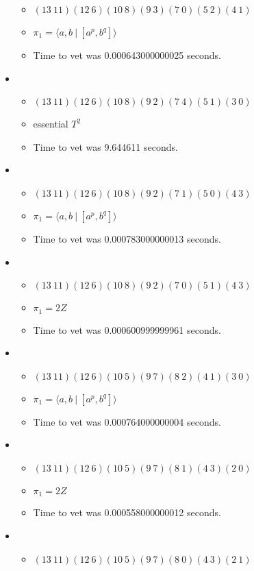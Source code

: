 \documentclass{article}
\begin{document}
\begin{itemize}
\begin{itemize}
      \item $(13\ 11)(12\ 6)(10\ 8)(9\ 3)(7\ 0)(5\ 2)(4\ 1)$
      \item $\pi_1 = \langle a,b\ |\ [a^p,b^q]\rangle$
      \item Time to vet was 0.000643000000025 seconds.
\end{itemize}
\item \begin{itemize}
      \item $(13\ 11)(12\ 6)(10\ 8)(9\ 2)(7\ 4)(5\ 1)(3\ 0)$
      \item essential $T^2$
      \item Time to vet was 9.644611 seconds.
\end{itemize}
\item \begin{itemize}
      \item $(13\ 11)(12\ 6)(10\ 8)(9\ 2)(7\ 1)(5\ 0)(4\ 3)$
      \item $\pi_1 = \langle a,b\ |\ [a^p,b^q]\rangle$
      \item Time to vet was 0.000783000000013 seconds.
\end{itemize}
\item \begin{itemize}
      \item $(13\ 11)(12\ 6)(10\ 8)(9\ 2)(7\ 0)(5\ 1)(4\ 3)$
      \item $\pi_1 =2 Z$
      \item Time to vet was 0.000600999999961 seconds.
\end{itemize}
\item \begin{itemize}
      \item $(13\ 11)(12\ 6)(10\ 5)(9\ 7)(8\ 2)(4\ 1)(3\ 0)$
      \item $\pi_1 = \langle a,b\ |\ [a^p,b^q]\rangle$
      \item Time to vet was 0.000764000000004 seconds.
\end{itemize}
\item \begin{itemize}
      \item $(13\ 11)(12\ 6)(10\ 5)(9\ 7)(8\ 1)(4\ 3)(2\ 0)$
      \item $\pi_1 =2 Z$
      \item Time to vet was 0.000558000000012 seconds.
\end{itemize}
\item \begin{itemize}
      \item $(13\ 11)(12\ 6)(10\ 5)(9\ 7)(8\ 0)(4\ 3)(2\ 1)$

\end{itemize}
\end{itemize}
\end{document}
